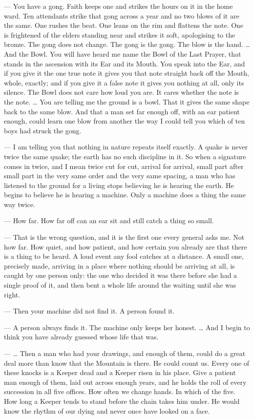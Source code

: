 \begin{room}
--- You have a gong. Faith keeps one and strikes the hours on it in the home ward. Ten attendants strike that gong across a year and no two blows of it are the same. One rushes the beat. One leans on the rim and flattens the note. One is frightened of the elders standing near and strikes it soft, apologising to the bronze. The gong does not change. The gong is the gong. The blow is the hand. \ldots{} And the Bowl. You will have heard me name the Bowl of the Last Prayer, that stands in the ascension with its Ear and its Mouth. You speak into the Ear, and if you give it the one true note it gives you that note straight back off the Mouth, whole, exactly; and if you give it a false note it gives you nothing at all, only its silence. The Bowl does not care how loud you are. It cares whether the note is the note. \ldots{} You are telling me the ground is a bowl. That it gives the same shape back to the same blow. And that a man set far enough off, with an ear patient enough, could learn one blow from another the way I could tell you which of ten boys had struck the gong.

--- I am telling you that nothing in nature repeats itself exactly. A quake is never twice the same quake; the earth has no such discipline in it. So when a signature comes in twice, and I mean twice cut for cut, arrival for arrival, small part after small part in the very same order and the very same spacing, a man who has listened to the ground for a living stops believing he is hearing the earth. He begins to believe he is hearing a machine. Only a machine does a thing the same way twice.

--- How far. How far off can an ear sit and still catch a thing so small.

--- That is the wrong question, and it is the first one every general asks me. Not how far. How quiet, and how patient, and how certain you already are that there is a thing to be heard. A loud event any fool catches at a distance. A small one, precisely made, arriving in a place where nothing should be arriving at all, is caught by one person only: the one who decided it was there before she had a single proof of it, and then bent a whole life around the waiting until she was right.

--- Then your machine did not find it. A person found it.

--- A person always finds it. The machine only keeps her honest. \ldots{} And I begin to think you have already guessed whose life that was.

--- \ldots{} Then a man who had your drawings, and enough of them, could do a great deal more than know that the Mountain is there. He could count us. Every one of these knocks is a Keeper dead and a Keeper risen in his place. Give a patient man enough of them, laid out across enough years, and he holds the roll of every succession in all five offices. How often we change hands. In which of the five. How long a Keeper tends to stand before the chain takes him under. He would know the rhythm of our dying and never once have looked on a face.


\end{room}
